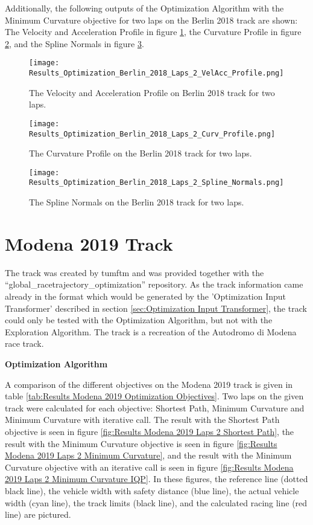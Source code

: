 Additionally, the following outputs of the Optimization Algorithm with the Minimum Curvature objective for two laps on the Berlin 2018 track are shown: The Velocity and Acceleration Profile in figure \ref{fig:Results Berlin 2018 Laps 2 VelAcc Profile}, the Curvature Profile in figure \ref{fig:Results Berlin 2018 Laps 2 Curv Profile}, and the Spline Normals in figure \ref{fig:Results Berlin 2018 Laps 2 Spline Normals}.
\begin{figure}[H]
    \centering
    \texttt{[image: Results\_Optimization\_Berlin\_2018\_Laps\_2\_VelAcc\_Profile.png]}
    \caption{The Velocity and Acceleration Profile on Berlin 2018 track for two laps.}
    \label{fig:Results Berlin 2018 Laps 2 VelAcc Profile}
\end{figure}
\begin{figure}[H]
    \centering
    \texttt{[image: Results\_Optimization\_Berlin\_2018\_Laps\_2\_Curv\_Profile.png]}
    \caption{The Curvature Profile on the Berlin 2018 track for two laps.}
    \label{fig:Results Berlin 2018 Laps 2 Curv Profile}
\end{figure}
\begin{figure}[H]
    \centering
    \texttt{[image: Results\_Optimization\_Berlin\_2018\_Laps\_2\_Spline\_Normals.png]}
    \caption{The Spline Normals on the Berlin 2018 track for two laps.}
    \label{fig:Results Berlin 2018 Laps 2 Spline Normals}
\end{figure}

\section{Modena 2019 Track} \label{sec:Results Modena 2019 Track}
The track was created by \acrshort{tumftm} and was provided together with the ``global\_racetrajectory\_optimization'' repository. \cite{tumftm_optimization_algoritm}
As the track information came already in the format which would be generated by the 'Optimization Input Transformer' described in section \ref{sec:Optimization Input Transformer}, the track could only be tested with the Optimization Algorithm, but not with the Exploration Algorithm. The track is a recreation of the Autodromo di Modena race track. \cite{modena_race_track}

\textbf{Optimization Algorithm}

A comparison of the different objectives on the Modena 2019 track is given in table \ref{tab:Results Modena 2019 Optimization Objectives}. Two laps on the given track were calculated for each objective: Shortest Path, Minimum Curvature and Minimum Curvature with iterative call. The result with the Shortest Path objective is seen in figure \ref{fig:Results Modena 2019 Laps 2 Shortest Path}, the result with the Minimum Curvature objective is seen in figure \ref{fig:Results Modena 2019 Laps 2 Minimum Curvature}, and the result with the Minimum Curvature objective with an iterative call is seen in figure \ref{fig:Results Modena 2019 Laps 2 Minimum Curvature IQP}. In these figures, the reference line (dotted black line), the vehicle width with safety distance (blue line), the actual vehicle width (cyan line), the track limits (black line), and the calculated racing line (red line) are pictured.

